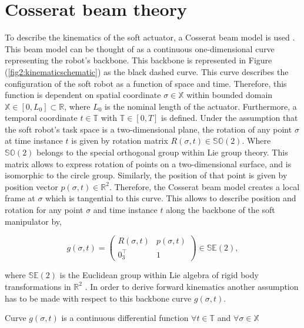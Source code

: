 \section{Cosserat beam theory}

To describe the kinematics of the soft actuator, a Cosserat beam model is used \cite{Boyer2019}. This beam model can be thought of as a continuous one-dimensional curve representing the robot's backbone. This backbone is represented in Figure (\ref{fig2:kinematicschematic}) as the black dashed curve. This curve describes the configuration of the soft robot as a function of space and time. Therefore, this function is dependent on spatial coordinate $\sigma \in \mathbb{X}$ within bounded domain $\mathbb{X} \in [0,L_0] \subset \mathbb{R}$, where $L_0$ is the nominal length of the actuator. Furthermore, a temporal coordinate $t \in \mathbb{T}$ with $\mathbb{T} \in [0,T]$ is defined. Under the assumption that the soft robot's task space is a two-dimensional plane, the rotation of any point $\sigma$ at time instance $t$ is given by rotation matrix $R(\sigma,t) \in \mathbb{SO}(2)$. Where $\mathbb{SO}(2)$ belongs to the special orthogonal group within Lie group theory. This matrix allows to express rotation of points on a two-dimensional surface, and is isomorphic to the circle group. Similarly, the position of that point is given by position vector $p(\sigma,t) \in \mathbb{R}^2$. Therefore, the Cosserat beam model creates a local frame at $\sigma$ which is tangential to this curve. This allows to describe position and rotation for any point $\sigma$ and time instance $t$ along the backbone of the soft manipulator by,


\begin{equation}
    g(\sigma,t) = \begin{pmatrix}  R(\sigma,t) & p(\sigma,t) \\ 0_3^\top & 1 \end{pmatrix} \in \mathbb{SE}(2),
    \label{eq2:g}
\end{equation}

where $\mathbb{SE}(2)$ is the Euclidean group within Lie algebra of rigid body transformations in $\mathbb{R}^2$ \cite{Sola2018}. In order to derive forward kinematics another assumption has to be made with respect to this backbone curve $g(\sigma,t)$.

\begin{theorem}
Curve  $g(\sigma,t)$ is a continuous differential function $ \forall t \in 
\mathbb{T} $ and $\forall \sigma \in \mathbb{X}$
\end{theorem}

